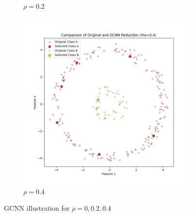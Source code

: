 \begin{figure}[ht]
\begin{subfigure}[b]{0.3\textwidth}
		\caption{$\rho = 0.2$}
		\label{fig:rho0.2}
	\end{subfigure}
	\hfill
	\begin{subfigure}[b]{0.3\textwidth}
		\centering
		\includegraphics[width=\textwidth]{figures/gcnn/comparison_plot_rho_0.4.png}
		\caption{$\rho = 0.4$}
		\label{fig:rho0.4}
	\end{subfigure}
	\caption{GCNN illustration for $\rho=0, 0.2, 0.4$}
	\label{fig:rho_variation_1}
\end{figure}

